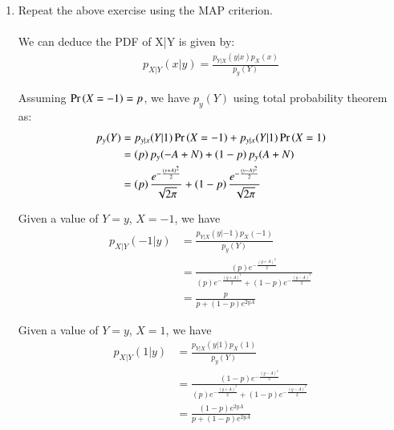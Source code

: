 \documentclass[journal,12pt,twocolumn]{IEEEtran}
\renewcommand\thesection{\arabic{section}}
\begin{document}
\begin{enumerate}[label=\thesection.\arabic*
,ref=\thesection.\theenumi]
	We again minimise this, using
	\begin{align}
		\frac{dP_e}{dA} = 0
	\end{align}
	\begin{align}
		\left(p\right) \frac{e^{-\frac{\left( \delta - A\right)^2}{2}}}{\sqrt{2\pi}} - \left(1-p\right) \frac{e^{-\frac{\left( \delta + A\right)^2}{2}}}{\sqrt{2\pi}} = 0
	\end{align}
	\begin{align}
		\frac{p}{1-p} = e^{-2A\delta}
	\end{align}
	\begin{align}
		\delta = \frac{1}{2A} \ln{\frac{1-p}{p}}
	\end{align}
	

\item Repeat the above exercise using the MAP criterion.
	\\
	\solution
	\\
	We can deduce the PDF of X|Y is given by:
	\begin{align}
		p_{X|Y}(x|y) = \frac{p_{Y|X}(y|x) p_X(x)}{p_y(Y)}
		\label{eq:Bayes}
	\end{align}

	Assuming $\Pr\left(X = -1\right) = p$, we have $p_y(Y)$ using total probability theorem as:
	\begin{align}
		p_y(Y) &= p_{y|x}(Y|1) \Pr\left(X=-1\right) + p_{y|x}(Y|1) \Pr\left(X=1\right) \\
		&= \left(p\right) p_y(-A+N) + \left(1-p\right) p_y(A+N) \\
		&= \left(p\right) \frac{e^{-\frac{(y+A)^2}{2}}}{\sqrt{2\pi}} + \left(1-p\right) \frac{e^{-\frac{(y-A)^2}{2}}}{\sqrt{2\pi}}
	\end{align}

	Given a value of $Y = y$, $X = -1$, we have
	\begin{align}
		p_{X|Y}(-1|y) &= \frac{p_{Y|X}(y|-1) p_X(-1)}{p_y(Y)} \\
		&= \frac{\left(p\right) e^{-\frac{(y+A)^2}{2}}}{\left(p\right) e^{-\frac{(y+A)^2}{2}} + \left(1-p\right) e^{-\frac{(y-A)^2}{2}}} \\
		&= \frac{p}{p + \left(1-p\right) e^{2yA}}
		\label{eq:MAP1}
	\end{align}

	Given a value of $Y = y$, $X = 1$, we have
	\begin{align}
		p_{X|Y}(1|y) &= \frac{p_{Y|X}(y|1) p_X(1)}{p_y(Y)} \\
		&= \frac{\left(1-p\right) e^{-\frac{(y-A)^2}{2}}}{\left(p\right) e^{-\frac{(y+A)^2}{2}} + \left(1-p\right) e^{-\frac{(y-A)^2}{2}}} \\
		&= \frac{\left(1-p\right) e^{2yA}}{p + \left(1-p\right) e^{2yA}}
		\label{eq:MAP2}
	\end{align}


\end{enumerate}
\end{document}
